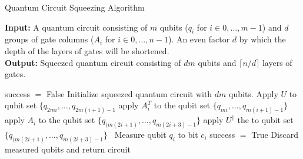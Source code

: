 \documentclass[Dual]{msu-thesis}
\begin{document}
\begin{algorithm}[H]
\label{alg:qcsa}

\caption{Quantum Circuit Squeezing Algorithm}\label{alg:qcsa}

\hspace*{\algorithmicindent} \textbf{Input:} A quantum circuit consisting of $m$ qubits ($q_i$ for $i\in0,\ldots,m-1$) and $d$ groups of gate columns ($A_i$ for $i\in0,\ldots,n-1$). An even factor $d$ by which the depth of the layers of gates will be shortened. 
\\
\hspace*{\algorithmicindent} \textbf{Output:} Squeezed quantum circuit consisting of $dm$ qubits and $\lceil n/d \rceil$ layers of gates.

\begin{algorithmic}[H]

\State success $=$ False
    \State Initialize squeezed quantum circuit with $dm$ qubits.
        \State Apply $U$ to qubit set $\{q_{2mi},\ldots,q_{2m(i+1)-1}$
    \EndFor
            \State apply $A^T_i$ to the qubit set $\{q_{mi},\ldots,q_{m(i+1)-1}\}$
        \EndIf
            \State apply $A_i$ to the qubit set $\{q_{(m(2i+1)},\ldots,q_{m(2i+3)-1}\}$
        \EndIf
    \EndFor
        \State apply $U^\dagger$ the to qubit set $\{q_{(m(2i+1)},\ldots,q_{m(2i+3)-1}\}$\
    \EndFor
        \State Measure qubit $q_i$ to bit $c_i$
    \EndFor
        \State success $=$ True
        \State Discard measured qubits and return circuit
    \EndIf
\EndWhile

\end{algorithmic}

\end{algorithm}
\end{document}
